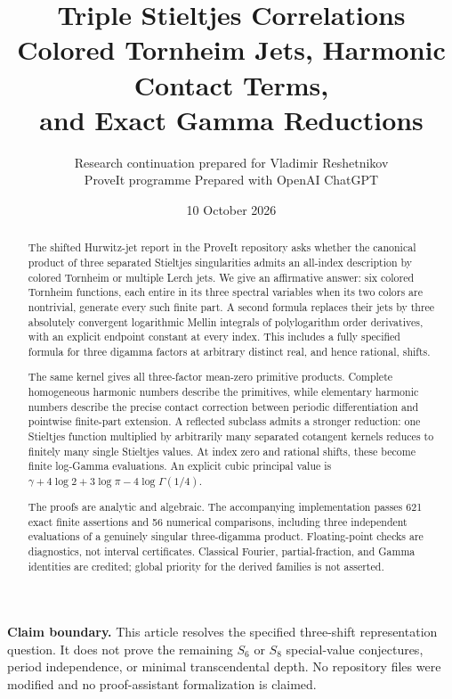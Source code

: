 \documentclass[11pt]{article}
\title{\textbf{Triple Stieltjes Correlations}\\[5pt]
\large Colored Tornheim Jets, Harmonic Contact Terms,\\
and Exact Gamma Reductions}
\author{Research continuation prepared for Vladimir Reshetnikov\\
\small ProveIt programme \quad\textbullet\quad Prepared with OpenAI ChatGPT}
\date{10 October 2026}
\numberwithin{equation}{section}
\theoremstyle{definition}\newtheorem{definition}[theorem]{Definition}
\theoremstyle{remark}\newtheorem{remark}[theorem]{Remark}
\begin{document}
\maketitle
\begin{abstract}
The shifted Hurwitz-jet report in the ProveIt repository asks whether the
canonical product of three separated Stieltjes singularities admits an
all-index description by colored Tornheim or multiple Lerch jets. We give
an affirmative answer: six colored Tornheim functions, each entire in its
three spectral variables when its two colors are nontrivial, generate every
such finite part. A second formula replaces their jets by three absolutely
convergent logarithmic Mellin integrals of polylogarithm order derivatives,
with an explicit endpoint constant at every index. This includes a fully
specified formula for three digamma factors at arbitrary distinct real,
and hence rational, shifts.

The same kernel gives all three-factor mean-zero primitive products. Complete homogeneous
harmonic numbers describe the primitives, while elementary harmonic numbers
describe the precise contact correction between periodic differentiation
and pointwise finite-part extension. A reflected subclass admits a stronger
reduction: one Stieltjes function multiplied by arbitrarily many separated
cotangent kernels reduces to finitely many single Stieltjes values. At
index zero and rational shifts, these become finite log-Gamma evaluations.
An explicit cubic principal value is
$\gamma+4\log2+3\log\pi-4\log\Gamma(1/4)$.

The proofs are analytic and algebraic. The accompanying implementation passes
621 exact finite assertions and 56 numerical comparisons, including three
independent evaluations of a genuinely singular three-digamma product.
Floating-point checks are diagnostics, not interval certificates. Classical
Fourier, partial-fraction, and Gamma identities are credited; global priority
for the derived families is not asserted.
\end{abstract}
\vspace{5pt}
\noindent\textbf{Claim boundary.} This article resolves the specified
three-shift representation question. It does not prove the remaining
$S_6$ or $S_8$ special-value conjectures, period independence, or minimal
transcendental depth. No repository files were modified and no
proof-assistant formalization is claimed.
\clearpage
\tableofcontents
\clearpage











\appendix


\end{document}

